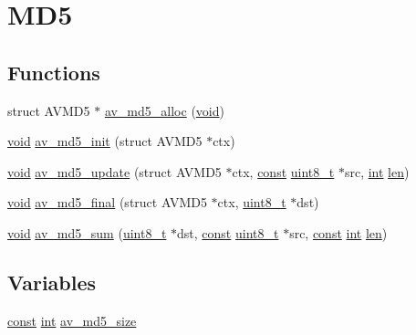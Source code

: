 \hypertarget{group__lavu__md5}{}\section{M\+D5}
\label{group__lavu__md5}
\subsection*{Functions}
\begin{DoxyCompactItemize}
\item 
struct A\+V\+M\+D5 $\ast$ \hyperlink{group__lavu__md5_ga5bf7cd7598f3be750458a53ed5c8ddde}{av\+\_\+md5\+\_\+alloc} (\hyperlink{sound_8c_ae35f5844602719cf66324f4de2a658b3}{void})
\item 
\hyperlink{sound_8c_ae35f5844602719cf66324f4de2a658b3}{void} \hyperlink{group__lavu__md5_ga31b412926441fa8f496a6033c6e918d0}{av\+\_\+md5\+\_\+init} (struct A\+V\+M\+D5 $\ast$ctx)
\item 
\hyperlink{sound_8c_ae35f5844602719cf66324f4de2a658b3}{void} \hyperlink{group__lavu__md5_gaebb2a5a3aa979c9464b676f2d873a4c2}{av\+\_\+md5\+\_\+update} (struct A\+V\+M\+D5 $\ast$ctx, \hyperlink{getopt1_8c_a2c212835823e3c54a8ab6d95c652660e}{const} \hyperlink{lib-src_2ffmpeg_2win32_2stdint_8h_a9a941819355e6f658991890ff66b4b0e}{uint8\+\_\+t} $\ast$src, \hyperlink{xmltok_8h_a5a0d4a5641ce434f1d23533f2b2e6653}{int} \hyperlink{lib_2expat_8h_af86d325fecfc8f47b61fbf5a5146f582}{len})
\item 
\hyperlink{sound_8c_ae35f5844602719cf66324f4de2a658b3}{void} \hyperlink{group__lavu__md5_ga855dfc4c59bc1da98635390f8294237c}{av\+\_\+md5\+\_\+final} (struct A\+V\+M\+D5 $\ast$ctx, \hyperlink{lib-src_2ffmpeg_2win32_2stdint_8h_a9a941819355e6f658991890ff66b4b0e}{uint8\+\_\+t} $\ast$dst)
\item 
\hyperlink{sound_8c_ae35f5844602719cf66324f4de2a658b3}{void} \hyperlink{group__lavu__md5_gad28ee17bdad299b9ed9293eaf834ffff}{av\+\_\+md5\+\_\+sum} (\hyperlink{lib-src_2ffmpeg_2win32_2stdint_8h_a9a941819355e6f658991890ff66b4b0e}{uint8\+\_\+t} $\ast$dst, \hyperlink{getopt1_8c_a2c212835823e3c54a8ab6d95c652660e}{const} \hyperlink{lib-src_2ffmpeg_2win32_2stdint_8h_a9a941819355e6f658991890ff66b4b0e}{uint8\+\_\+t} $\ast$src, \hyperlink{getopt1_8c_a2c212835823e3c54a8ab6d95c652660e}{const} \hyperlink{xmltok_8h_a5a0d4a5641ce434f1d23533f2b2e6653}{int} \hyperlink{lib_2expat_8h_af86d325fecfc8f47b61fbf5a5146f582}{len})
\end{DoxyCompactItemize}
\subsection*{Variables}
\begin{DoxyCompactItemize}
\item 
\hyperlink{getopt1_8c_a2c212835823e3c54a8ab6d95c652660e}{const} \hyperlink{xmltok_8h_a5a0d4a5641ce434f1d23533f2b2e6653}{int} \hyperlink{group__lavu__md5_ga758362caf2146c2ef1e433415893d536}{av\+\_\+md5\+\_\+size}
\end{DoxyCompactItemize}



